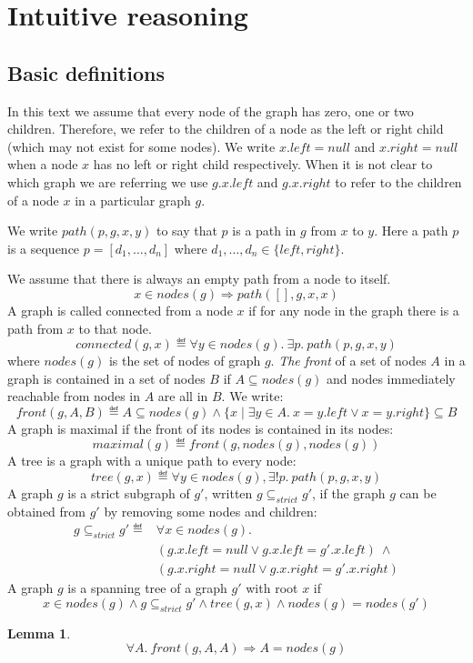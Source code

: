 \documentclass[]{scrartcl}
\newtheorem{lemma}{Lemma}
\newcommand{\path}{\mathit{path}}
\newcommand{\connected}{\mathit{connected}}
\newcommand{\nodes}{\mathit{nodes}}
\newcommand{\front}{\mathit{front}}
\newcommand{\maximal}{\mathit{maximal}}
\newcommand{\Left}{\mathit{left}}
\newcommand{\Right}{\mathit{right}}
\newcommand{\tree}{\mathit{tree}}
\newcommand{\Null}{\mathit{null}}
\newcommand{\strictSG}{\subseteq_{\mathit{strict}}}
\begin{document}
\section{Intuitive reasoning}\label{sect:int:reas}
\subsection{Basic definitions}
In this text we assume that every node of the graph has zero, one or two children.
Therefore, we refer to the children of a node as the left or right child (which may not exist for some nodes).
We write $x.\Left = \Null$ and $x.\Right = \Null$ when a node $x$ has no left or right child respectively.
When it is not clear to which graph we are referring we use $g.x.\Left$ and $g.x.\Right$ to refer to the children of a node $x$ in a particular graph $g$.

We write $\path(p, g, x, y)$ to say that $p$ is a path in $g$ from $x$ to $y$.
Here a path $p$ is a sequence
$p = [d_1, \dots, d_n ]$ where $d_1,\dots, d_n \in \{\Left, \Right\}$.

We assume that there is always an empty path from a node to itself.
\[
x \in \nodes(g) \Rightarrow \path([], g, x, x)
\]
A graph is called connected from a node $x$ if for any node in the graph there is a path from $x$ to that node.
\[
\connected(g, x) \eqdef \forall y \in \nodes(g).~ \exists p.~\path(p, g, x, y)
\]
where $\nodes(g)$ is the set of nodes of graph $g$.
\emph{The front} of a set of nodes $A$ in a graph is contained in
a set of nodes $B$ if $A \subseteq \nodes(g)$ and nodes immediately reachable
from nodes in $A$ are all in $B$. We write:
\[
\front(g, A, B) \eqdef A \subseteq \nodes(g) \land
\{x \mid \exists y \in A.~x = y.\Left \lor x = y.\Right \} \subseteq B
\]
A graph is maximal if the front of its nodes is contained in its nodes:
\[
\maximal(g) \eqdef \front(g, \nodes(g), \nodes(g))
\]
A tree is a graph with a unique path to every node:
\[
\tree(g, x) \eqdef \forall y \in \nodes(g), \exists! p.~\path(p, g, x, y)
\]
A graph $g$ is a strict subgraph of $g'$, written $g \strictSG g'$,
if the graph $g$ can be obtained from $g'$ by removing some nodes and children:
\[
\begin{array}{ll}
g \strictSG g' \eqdef & \forall x \in \nodes(g).\\
& (g.x.\Left = \Null \lor g.x.\Left = g'.x.\Left)~\land \\
& (g.x.\Right = \Null \lor g.x.\Right = g'.x.\Right)
\end{array}
\]
A graph $g$ is a spanning tree of a graph $g'$ with root $x$ if
\[
x \in \nodes(g) \land g \strictSG g' \land \tree(g, x) \land \nodes(g) = \nodes(g')
\]
\begin{lemma}\label{lem:in_front_nodes}
\[
\forall A.~ \front(g, A, A) \Rightarrow A = \nodes(g)
\]
\end{lemma}
\end{document}
